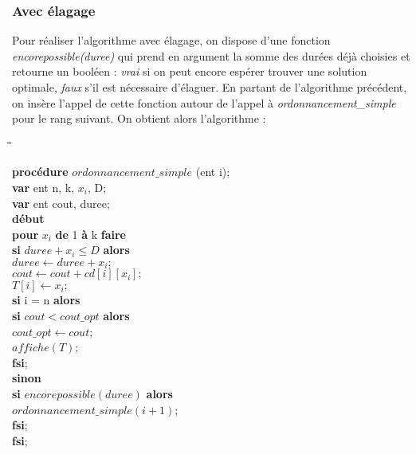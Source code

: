 \documentclass[a4paper, titlepage]{article}
\begin{document}
		\subsubsection{Avec élagage}

			Pour réaliser l'algorithme avec élagage, on dispose d'une fonction \emph{encorepossible(duree)} qui prend en argument la somme des durées déjà choisies et retourne un booléen :
			\emph{vrai} si on peut encore espérer trouver une solution optimale, \emph{faux} s'il est nécessaire d'élaguer.
			En partant de l'algorithme précédent, on insère l'appel de cette fonction autour de l'appel à \emph{ordonnancement\_simple} pour le rang suivant.
			On obtient alors l'algorithme :

			\begin{tabbing}

			\hspace{1cm}\=\hspace{1cm}\=\hspace{1cm}\=\hspace{1cm}\=\hspace{1cm}\=\kill %

			\textbf{procédure} $ordonnancement\_simple$ (ent i); \\
			\textbf{var} ent n, k, $x_{i}$, D; \\
			\textbf{var} ent cout, duree; \\
			\textbf{début} \\
			\> \textbf{pour} $x_{i}$ \textbf{de} 1 \textbf{à} k \textbf{faire} \\
			\>\> \textbf{si} $duree+x_{i}\le D$ \textbf{alors} \\
			\>\>\> $duree \leftarrow duree + x_{i};$ \\
			\>\>\> $cout \leftarrow cout + cd[i][x_{i}];$ \\
			\>\>\> $T[i] \leftarrow x_{i};$ \\

			\>\>\> \textbf{si} i = n \textbf{alors} \\
			\>\>\>\> \textbf{si} $cout < cout\_opt$ \textbf{alors} \\
			\>\>\>\>\> $cout\_opt \leftarrow cout$; \\
			\>\>\>\>\> $affiche(T)$; \\
			\>\>\>\> \textbf{fsi}; \\

			\>\>\> \textbf{sinon} \\
			\>\>\>\> \textbf{si} $encorepossible (duree)$ \textbf{alors} \\
			\>\>\>\>\> $ordonnancement\_simple(i+1)$; \\
			\>\>\>\> \textbf{fsi}; \\
			\>\>\> \textbf{fsi}; \\


\end{tabbing}
\end{document}
